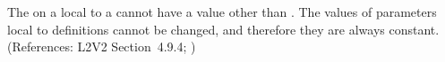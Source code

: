 The   on a \Parameter local to a \KineticLaw cannot
have a value other than .  The values of parameters local to
\KineticLaw definitions cannot be changed, and therefore they are always
constant.  (References: L2V2 Section~4.9.4; )

